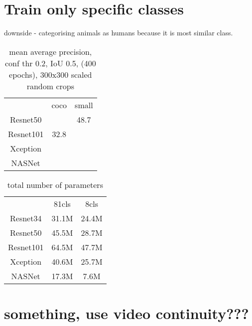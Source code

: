 \section{Train only specific classes}
downside - categorising animals as humans because it is most similar class.
\begin{table}
    \begin{tabular}{c|c|c}
         & coco & small \\
        Resnet50 & & 48.7\\
        Resnet101 & 32.8 & \\
        Xception & & \\
        NASNet & & \\
    \end{tabular}
    \caption{mean average precision, conf thr 0.2, IoU 0.5,  (400 epochs), 300x300 scaled random crops}
    \label{tab:map}
\end{table}


\begin{table}
    \begin{tabular}{c|c|c}
     & 81cls & 8cls  \\
    Resnet34 & 31.1M & 24.4M\\
    Resnet50 & 45.5M & 28.7M\\
    Resnet101 & 64.5M & 47.7M \\
    Xception & 40.6M & 25.7M \\
    NASNet & 17.3M & 7.6M \\
    \end{tabular}
    \caption{total number of parameters}
    \label{tab:parameters}
\end{table}



\section{something, use video continuity???}